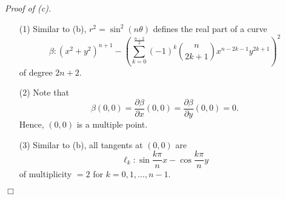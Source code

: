 \documentclass{article}
\begin{document}
\emph{Proof of (c).}
\begin{enumerate}
\item[(1)]
  Similar to (b),
  $r^2 = \sin^2(n\theta)$ defines the real part of a curve
  \[
    \beta: (x^2+y^2)^{n+1}
    - \left( \sum_{k=0}^{\frac{n-2}{2}} (-1)^k {n \choose 2k+1} x^{n-2k-1} y^{2k+1} \right)^2
  \]
  of degree $2n+2$.

\item[(2)]
  Note that
  \[
    \beta(0,0)
    = \frac{\partial \beta}{\partial x}(0,0)
    = \frac{\partial \beta}{\partial y}(0,0)
    = 0.
  \]
  Hence, $(0,0)$ is a multiple point.

\item[(3)]
  Similar to (b), all tangents at $(0,0)$ are
  \[
    \ell_k: \sin\frac{k\pi}{n} x - \cos\frac{k\pi}{n} y
  \]
  of multiplicity $= 2$ for $k = 0, 1, \ldots, n-1$.
\end{enumerate}
$\Box$ \\
\end{document}
